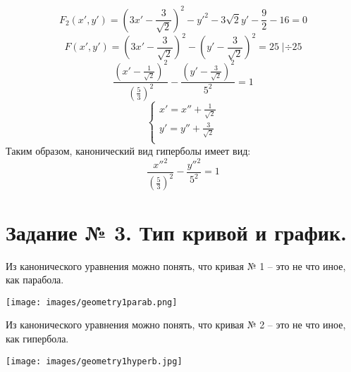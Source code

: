 \documentclass{article}
\theoremstyle{plain}
\begin{document}
\begin{enumerate}
    $$F_2(x', y') = (3x' - \frac{3}{\sqrt{2}})^2 - y'^2 - 3\sqrt{2}y' - \frac{9}{2} - 16 = 0$$
    $$F(x', y') = (3x' - \frac{3}{\sqrt{2}})^2 - (y' - \frac{3}{\sqrt{2}})^2 = 25 \;| \div 25$$
    $$\frac{ (x' - \frac{1}{\sqrt{2}})^2 }{(\frac{5}{3})^2} - \frac{ (y' - \frac{ 3 }{\sqrt{2}})^2}{5^2} = 1$$
    \begin{equation}
        \begin{cases}
        x' = x'' + \frac{1}{\sqrt{2}}\\
        y' = y'' + \frac{3}{\sqrt{2}}\\
        \end{cases}
    \end{equation}
    Таким образом, канонический вид гиперболы имеет вид:
    $$\frac{x''^2}{(\frac{5}{3})^2} - \frac{y''^2}{5^2} = 1$$
    \newpage
    \section{Задание № 3. Тип кривой и график.}
    Из канонического уравнения можно понять, что кривая № 1 -- это не что иное, как парабола.
    \begin{center}
    \texttt{[image: images/geometry1parab.png]}
    \end{center}
    \newpage
    Из канонического уравнения можно понять, что кривая № 2 -- это не что иное, как гипербола.
    \begin{center}
    \texttt{[image: images/geometry1hyperb.jpg]}
    \end{center}
    \newpage

\end{enumerate}
\end{document}
